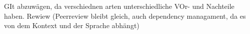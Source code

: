 \documentclass[11pt]{article}
\begin{document}


GIt abzuwägen, da verschiednen arten unterschiedliche VOr- und Nachteile haben. Rewiew (Peerreview bleibt gleich, auch dependency managament, da es von dem Kontext und der Sprache abhängt)

\end{document}
